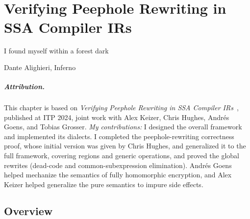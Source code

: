 \newcommand{\messa}[1]{\ensuremath{\texttt{LeanMLIR}(#1)}}


\providecommand{\GreenBox}[1]{\smash{\colorbox{materialLightGreen}{\texttt{#1}}}}
\providecommand{\LightGrayBlueBox}[1]{\smash{\colorbox{materialLightGrayBlueColor}{\texttt{#1}}}}

\chapter{Verifying Peephole Rewriting in SSA Compiler IRs}
\label{ch:lean-mlir}
\epigraph{I found myself within a forest dark} {Dante Alighieri, Inferno}

\paragraph*{Attribution.} This chapter is based on \emph{Verifying Peephole
Rewriting in SSA Compiler IRs}~\citep{leanmlir}, published at ITP 2024, joint
work with Alex Keizer, Chris Hughes, Andrés Goens, and Tobias Grosser.
\emph{My contributions:} I designed the overall framework and implemented its
dialects. I completed the peephole-rewriting correctness proof, whose initial
version was given by Chris Hughes, and generalized it to the full framework,
covering regions and generic operations, and proved the global rewrites (dead-code
and common-subexpression elimination). Andrés Goens helped mechanize the semantics
of fully homomorphic encryption, and Alex Keizer helped generalize the pure
semantics to impure side effects.


\section{Overview}
\label{sec:mlir:overview}

